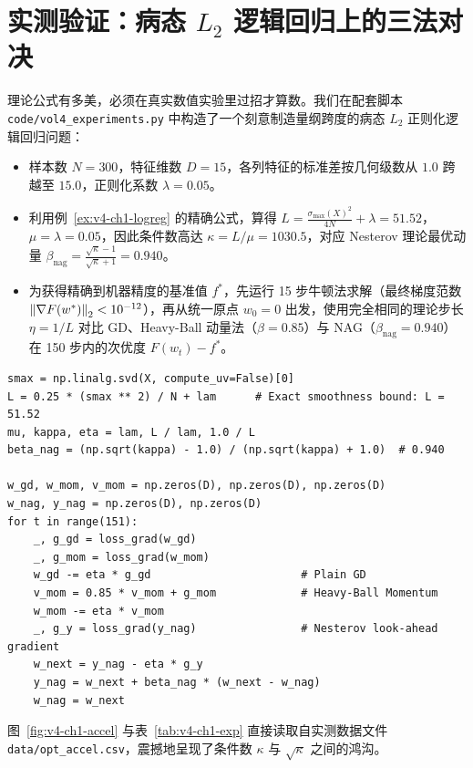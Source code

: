 \section{实测验证：病态 $L_2$ 逻辑回归上的三法对决}

理论公式有多美，必须在真实数值实验里过招才算数。我们在配套脚本 \texttt{code/vol4\_experiments.py} 中构造了一个刻意制造量纲跨度的病态 $L_2$ 正则化逻辑回归问题：
\begin{itemize}
  \item 样本数 $N = 300$，特征维数 $D = 15$，各列特征的标准差按几何级数从 $1.0$ 跨越至 $15.0$，正则化系数 $\lambda = 0.05$。
  \item 利用例~\ref{ex:v4-ch1-logreg} 的精确公式，算得 $L = \frac{\sigma_{\max}(X)^2}{4N} + \lambda = 51.52$，$\mu = \lambda = 0.05$，因此条件数高达 $\kappa = L/\mu = 1030.5$，对应 Nesterov 理论最优动量 $\beta_{\text{nag}} = \frac{\sqrt{\kappa}-1}{\sqrt{\kappa}+1} = 0.940$。
  \item 为获得精确到机器精度的基准值 $f^*$，先运行 15 步牛顿法求解（最终梯度范数 $\left\|\nabla F(w^*)\right\|_2 < 10^{-12}$），再从统一原点 $w_0 = 0$ 出发，使用完全相同的理论步长 $\eta = 1/L$ 对比 GD、Heavy-Ball 动量法（$\beta = 0.85$）与 NAG（$\beta_{\text{nag}} = 0.940$）在 150 步内的次优度 $F(w_t) - f^*$。
\end{itemize}

\begin{lstlisting}[caption={病态 $L_2$ 逻辑回归上 GD、Momentum 与 NAG 的核心实现（节选自 \texttt{vol4\_experiments.py}）},label={lst:v4-ch1-opt}]
smax = np.linalg.svd(X, compute_uv=False)[0]
L = 0.25 * (smax ** 2) / N + lam      # Exact smoothness bound: L = 51.52
mu, kappa, eta = lam, L / lam, 1.0 / L
beta_nag = (np.sqrt(kappa) - 1.0) / (np.sqrt(kappa) + 1.0)  # 0.940

w_gd, w_mom, v_mom = np.zeros(D), np.zeros(D), np.zeros(D)
w_nag, y_nag = np.zeros(D), np.zeros(D)
for t in range(151):
    _, g_gd = loss_grad(w_gd)
    _, g_mom = loss_grad(w_mom)
    w_gd -= eta * g_gd                       # Plain GD
    v_mom = 0.85 * v_mom + g_mom             # Heavy-Ball Momentum
    w_mom -= eta * v_mom
    _, g_y = loss_grad(y_nag)                # Nesterov look-ahead gradient
    w_next = y_nag - eta * g_y
    y_nag = w_next + beta_nag * (w_next - w_nag)
    w_nag = w_next
\end{lstlisting}

图~\ref{fig:v4-ch1-accel} 与表~\ref{tab:v4-ch1-exp} 直接读取自实测数据文件 \texttt{data/opt\_accel.csv}，震撼地呈现了条件数 $\kappa$ 与 $\sqrt{\kappa}$ 之间的鸿沟。

